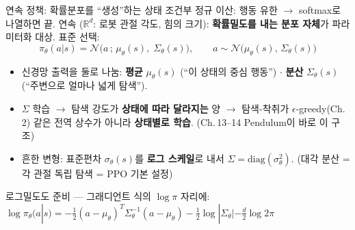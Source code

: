 \documentclass[aspectratio=169,11pt]{beamer}
\begin{document}
\begin{frame}{연속 정책: 확률분포를 ``생성''하는 상태 조건부 정규}
  이산: 행동 유한 $\to$ softmax로 나열하면 끝. 연속 ($\mathbb{R}^d$:
  로봇 관절 각도, 힘의 크기): \textbf{확률밀도를 내는 분포 자체}가
  파라미터화 대상. 표준 선택:
  \[
  \pi_\theta(a|s) = \mathcal{N}\big(a\,;\, \mu_\theta(s),\; \Sigma_\theta(s)\big),
  \qquad
  a \sim \mathcal{N}\big(\mu_\theta(s),\, \Sigma_\theta(s)\big)
  \]
  \begin{itemize}
    \item 신경망 출력을 둘로 나눔: \textbf{평균} $\mu_\theta(s)$
      (``이 상태의 중심 행동'') $\cdot$ \textbf{분산} $\Sigma_\theta(s)$
      (``주변으로 얼마나 넓게 탐색'').
    \item $\Sigma$ 학습 $\to$ 탐색 강도가 \textbf{상태에 따라 달라지는}
      양 $\to$ 탐색-착취가 $\epsilon$-greedy(Ch.\,2) 같은 전역 상수가
      아니라 \textbf{상태별로 학습}. (Ch.\,13--14 Pendulum이 바로 이 구조)
    \item 흔한 변형: 표준편차 $\sigma_\theta(s)$를 \textbf{로그 스케일}로
      내서 $\Sigma = \text{diag}(\sigma_\theta^2)$.
      (대각 분산 = 각 관절 독립 탐색 = PPO 기본 설정)
  \end{itemize}
  {\footnotesize 로그밀도도 준비 --- 그래디언트 식의 $\log\pi$ 자리에:
  $\log\pi_\theta(a|s) = -\tfrac12(a-\mu_\theta)^T \Sigma_\theta^{-1}
  (a-\mu_\theta) - \tfrac12\log|\Sigma_\theta| - \tfrac{d}{2}\log 2\pi$}
\end{frame}

\end{document}
